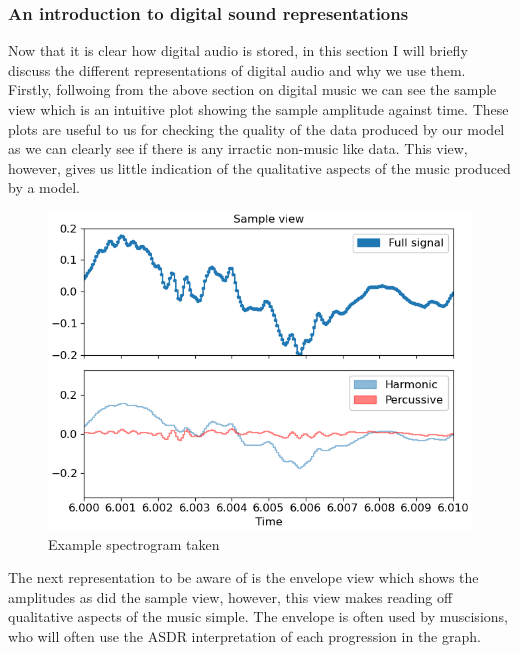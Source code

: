 \documentclass{article}
\begin{document}
\subsubsection{An introduction to digital sound representations}
Now that it is clear how digital audio is stored, in this section I will briefly discuss the different representations of digital audio and why we use them. \\
Firstly, follwoing from the above section on digital music we can see the sample view which is an intuitive plot showing the sample amplitude against time. These plots are useful to us for checking the quality of the data produced by our model as we can clearly see if there is any irractic non-music like data. This view, however, gives us little indication of the qualitative aspects of the music produced by a model. 
\begin{figure}[H]
\caption{Example spectrogram taken \cite{mcfee2015librosa}}
\includegraphics[scale=0.5]{librosa-display-waveshow-1_01.png}
\end{figure}
The next representation to be aware of is the envelope view which shows the amplitudes as did the sample view, however, this view makes reading off qualitative aspects of the music simple. The envelope is often used by muscisions, who will often use the ASDR interpretation of each progression in the graph. \cite{vail_2013}
\end{document}

